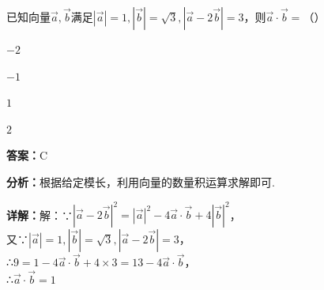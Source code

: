 \begin{question}[points=5]
已知向量$\vec{a}, \vec{b}$满足$|\vec{a}| = 1, |\vec{b}| = \sqrt{3}, |\vec{a} - 2\vec{b}| = 3$，则$\vec{a} \cdot \vec{b} =$（\qquad）
\begin{choices}
  \item $-2$
  \item $-1$
  \item $1$
  \item $2$
\end{choices}
\begin{solution}
\textbf{答案：}C

\textbf{分析：}根据给定模长，利用向量的数量积运算求解即可.

\textbf{详解：}解：∵$|\vec{a} - 2\vec{b}|^2 = |\vec{a}|^2 - 4\vec{a} \cdot \vec{b} + 4|\vec{b}|^2$，\\又∵$|\vec{a}| = 1, |\vec{b}| = \sqrt{3}, |\vec{a} - 2\vec{b}| = 3$，\\∴$9 = 1 - 4\vec{a} \cdot \vec{b} + 4 \times 3 = 13 - 4\vec{a} \cdot \vec{b}$，\\∴$\vec{a} \cdot \vec{b} = 1$
\end{solution}
\end{question}

